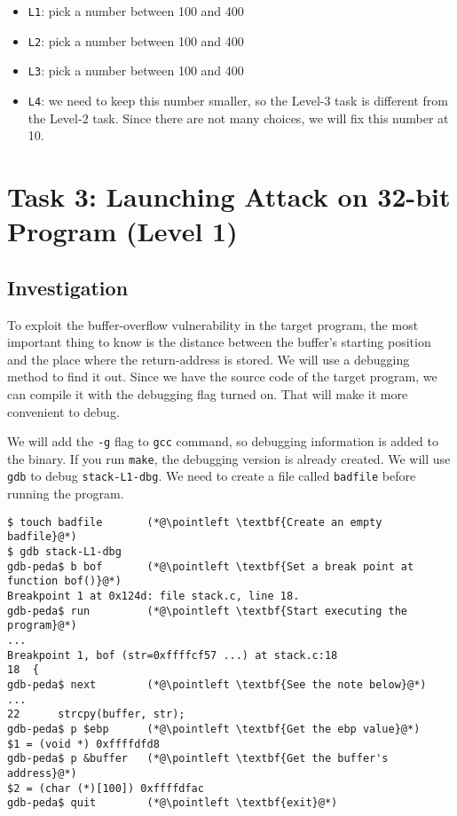 \begin{itemize}[noitemsep]
\item \texttt{L1}: pick a number between 100 and 400 
\item \texttt{L2}: pick a number between 100 and 400 
\item \texttt{L3}: pick a number between 100 and 400 
\item \texttt{L4}: we need to keep this number smaller, so the Level-3 task
is different from the Level-2 task. Since there are not many choices,
we will fix this number at 10.
\end{itemize}
 




\section{Task 3: Launching Attack on 32-bit Program (Level 1)}

\subsection{Investigation} 

To exploit the buffer-overflow vulnerability in the target program,
the most important thing to know is the distance between the 
buffer's starting position and the place where the return-address
is stored. We will use a debugging method to find it out.
Since we have the source code of the target program, we
can compile it with the debugging flag turned on. That will make it more
convenient to debug. 

We will add the \texttt{-g} flag to \texttt{gcc} command, so debugging information
is added to the binary. If you run \texttt{make}, the debugging version
is already created. We will use \texttt{gdb} to debug \texttt{stack-L1-dbg}.  
We need to create a file called
\texttt{badfile} before running the program. 


\newcommand{\pointleft}{\reflectbox{\ding{221}}\xspace}

\begin{lstlisting}
$ touch badfile       (*@\pointleft \textbf{Create an empty badfile}@*)
$ gdb stack-L1-dbg
gdb-peda$ b bof       (*@\pointleft \textbf{Set a break point at function bof()}@*)
Breakpoint 1 at 0x124d: file stack.c, line 18.
gdb-peda$ run         (*@\pointleft \textbf{Start executing the program}@*)
...
Breakpoint 1, bof (str=0xffffcf57 ...) at stack.c:18
18  {
gdb-peda$ next        (*@\pointleft \textbf{See the note below}@*)
...
22	    strcpy(buffer, str);
gdb-peda$ p $ebp      (*@\pointleft \textbf{Get the ebp value}@*)
$1 = (void *) 0xffffdfd8   
gdb-peda$ p &buffer   (*@\pointleft \textbf{Get the buffer's address}@*)
$2 = (char (*)[100]) 0xffffdfac
gdb-peda$ quit        (*@\pointleft \textbf{exit}@*)
\end{lstlisting}

